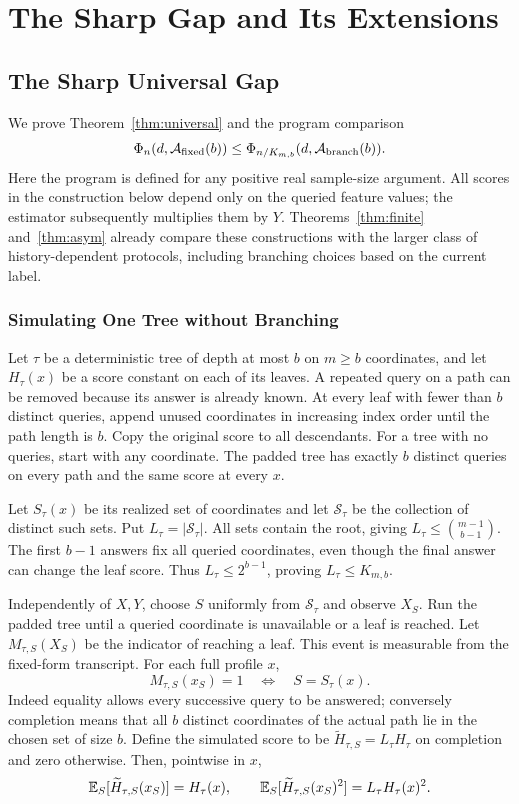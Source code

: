 \section{The Sharp Gap and Its Extensions}\label{app:C}
\subsection{The Sharp Universal Gap}\label{app:universal}
We prove Theorem~\ref{thm:universal} and the program comparison
\begin{equation}
 \Phi_n(d,\mathcal A_{\rm fixed}(b))
 \le \Phi_{n/K_{m,b}}(d,\mathcal A_{\rm branch}(b)).
 \label{eq:programsimulation}
\end{equation}
Here the program is defined for any positive real sample-size argument.
All scores in the construction below depend only on the queried feature values; the estimator subsequently multiplies them by $Y$. Theorems~\ref{thm:finite} and~\ref{thm:asym} already compare these constructions with the larger class of history-dependent protocols, including branching choices based on the current label.

\subsubsection{Simulating One Tree without Branching}
Let $\tau$ be a deterministic tree of depth at most $b$ on $m\ge b$ coordinates, and let $H_\tau(x)$ be a score constant on each of its leaves. A repeated query on a path can be removed because its answer is already known. At every leaf with fewer than $b$ distinct queries, append unused coordinates in increasing index order until the path length is $b$. Copy the original score to all descendants. For a tree with no queries, start with any coordinate. The padded tree has exactly $b$ distinct queries on every path and the same score at every $x$.

Let $S_\tau(x)$ be its realized set of coordinates and let $\mathcal S_\tau$ be the collection of distinct such sets. Put $L_\tau=|\mathcal S_\tau|$. All sets contain the root, giving $L_\tau\le\binom{m-1}{b-1}$. The first $b-1$ answers fix all queried coordinates, even though the final answer can change the leaf score. Thus $L_\tau\le2^{b-1}$, proving $L_\tau\le K_{m,b}$.

Independently of $X,Y$, choose $S$ uniformly from $\mathcal S_\tau$ and observe $X_S$. Run the padded tree until a queried coordinate is unavailable or a leaf is reached. Let $M_{\tau,S}(X_S)$ be the indicator of reaching a leaf. This event is measurable from the fixed-form transcript. For each full profile $x$,
\[
 M_{\tau,S}(x_S)=1\quad\Longleftrightarrow\quad S=S_\tau(x).
\]
Indeed equality allows every successive query to be answered; conversely completion means that all $b$ distinct coordinates of the actual path lie in the chosen set of size $b$. Define the simulated score to be $\widetilde H_{\tau,S}=L_\tau H_\tau$ on completion and zero otherwise. Then, pointwise in $x$,
\begin{equation}
 \mathbb{E}_S[\widetilde H_{\tau,S}(x_S)]=H_\tau(x),\qquad
 \mathbb{E}_S[\widetilde H_{\tau,S}(x_S)^2]=L_\tau H_\tau(x)^2.
 \label{eq:simulate-moments}
\end{equation}

